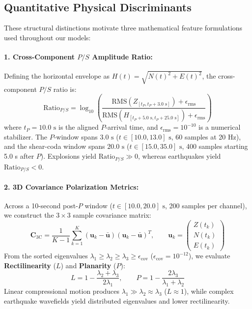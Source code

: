 \documentclass[11pt,a4paper]{article}
\begin{document}
\subsection{Quantitative Physical Discriminants}
These structural distinctions motivate three mathematical feature formulations used throughout our models:

\paragraph{1. Cross-Component $P/S$ Amplitude Ratio:}
Defining the horizontal envelope as $H(t) = \sqrt{N(t)^2 + E(t)^2}$, the cross-component $P/S$ ratio is:
\begin{equation*}
    \text{Ratio}_{P/S} = \log_{10} \left( \frac{\text{RMS}(Z_{[t_P, t_P + 3.0\text{ s}]}) + \epsilon_{\text{rms}}}{\text{RMS}(H_{[t_P + 5.0\text{ s}, t_P + 25.0\text{ s}]}) + \epsilon_{\text{rms}}} \right)
\end{equation*}
where $t_P = 10.0\text{ s}$ is the aligned $P$-arrival time, and $\epsilon_{\text{rms}} = 10^{-10}$ is a numerical stabilizer. The $P$-window spans $3.0\text{ s}$ ($t \in [10.0, 13.0]\text{ s}$, 60 samples at 20 Hz), and the shear-coda window spans $20.0\text{ s}$ ($t \in [15.0, 35.0]\text{ s}$, 400 samples starting 5.0 s after $P$). Explosions yield $\text{Ratio}_{P/S} \gg 0$, whereas earthquakes yield $\text{Ratio}_{P/S} < 0$.

\paragraph{2. 3D Covariance Polarization Metrics:}
Across a 10-second post-$P$ window ($t \in [10.0, 20.0]\text{ s}$, 200 samples per channel), we construct the $3 \times 3$ sample covariance matrix:
\begin{equation*}
    \mathbf{C}_{3\text{C}} = \frac{1}{K - 1} \sum_{k=1}^K (\mathbf{u}_k - \bar{\mathbf{u}})(\mathbf{u}_k - \bar{\mathbf{u}})^T, \qquad \mathbf{u}_k = \begin{pmatrix} Z(t_k) \\ N(t_k) \\ E(t_k) \end{pmatrix}
\end{equation*}
From the sorted eigenvalues $\lambda_1 \ge \lambda_2 \ge \lambda_3 \ge \epsilon_{\text{cov}}$ ($\epsilon_{\text{cov}} = 10^{-12}$), we evaluate \textbf{Rectilinearity} ($L$) and \textbf{Planarity} ($P$):
\begin{equation*}
    L = 1 - \frac{\lambda_2 + \lambda_3}{2\lambda_1}, \qquad P = 1 - \frac{2\lambda_3}{\lambda_1 + \lambda_2}
\end{equation*}
Linear compressional motion produces $\lambda_1 \gg \lambda_2 \approx \lambda_3$ ($L \approx 1$), while complex earthquake wavefields yield distributed eigenvalues and lower rectilinearity.
\end{document}
